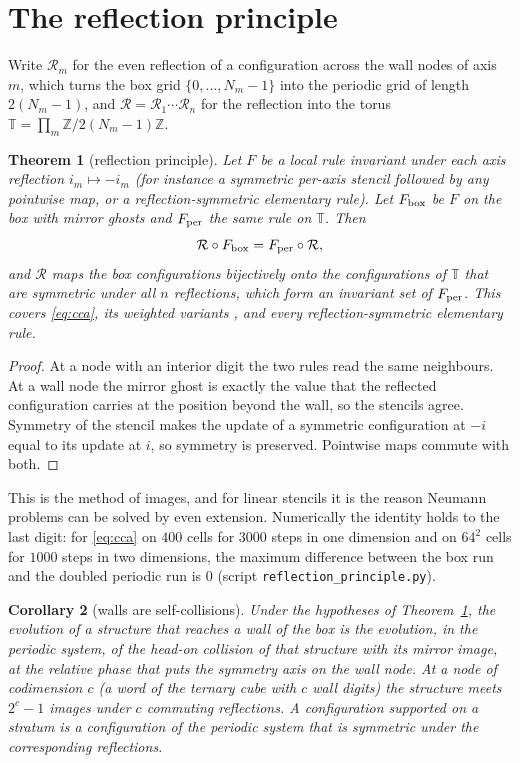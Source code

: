 \documentclass[11pt,a4paper]{article}
\newtheorem{theorem}{Theorem}[section]
\newtheorem{corollary}[theorem]{Corollary}
\theoremstyle{definition}
\theoremstyle{remark}
\newcommand{\Z}{\mathbb{Z}}
\begin{document}
\section{The reflection principle}\label{sec:reflection}

Write $\mathcal R_m$ for the even reflection of a configuration across
the wall nodes of axis $m$, which turns the box grid
$\{0,\dots,N_m-1\}$ into the periodic grid of length $2(N_m-1)$, and
$\mathcal R=\mathcal R_1\cdots\mathcal R_n$ for the reflection into the
torus $\mathbb T=\prod_m\Z/2(N_m-1)\Z$.

\begin{theorem}[reflection principle]\label{thm:reflection}
Let $F$ be a local rule invariant under each axis reflection
$i_m\mapsto-i_m$ (for instance a symmetric per-axis stencil followed by
any pointwise map, or a reflection-symmetric elementary rule). Let $F_{\rm box}$ be $F$ on
the box with mirror ghosts and $F_{\rm per}$ the same rule on
$\mathbb T$. Then
\[
  \mathcal R\circ F_{\rm box}=F_{\rm per}\circ\mathcal R ,
\]
and $\mathcal R$ maps the box configurations bijectively onto the
configurations of $\mathbb T$ that are symmetric under all $n$
reflections, which form an invariant set of $F_{\rm per}$. This covers
\eqref{eq:cca}, its weighted variants \cite[p.~244]{NKS}, and every
reflection-symmetric elementary rule.
\end{theorem}

\begin{proof}
At a node with an interior digit the two rules read the same neighbours.
At a wall node the mirror ghost is exactly the value that the reflected
configuration carries at the position beyond the wall, so the stencils
agree. Symmetry of the stencil makes the update of a symmetric
configuration at $-i$ equal to its update at $i$, so symmetry is
preserved. Pointwise maps commute with both.
\end{proof}

This is the method of images, and for linear stencils it is the reason
Neumann problems can be solved by even extension. Numerically the
identity holds to the last digit: for \eqref{eq:cca} on $400$ cells for
$3000$ steps in one dimension and on $64^2$ cells for $1000$ steps in
two dimensions, the maximum difference between the box run and the
doubled periodic run is $0$ (script \texttt{reflection\_principle.py}).

\begin{corollary}[walls are self-collisions]\label{cor:self}
Under the hypotheses of Theorem~\ref{thm:reflection}, the evolution of
a structure that reaches a wall of the box is the evolution, in the
periodic system, of the head-on collision of that structure with its
mirror image, at the relative phase that puts the symmetry axis on the
wall node. At a node of codimension $c$ (a word of the ternary cube with
$c$ wall digits) the structure meets $2^c-1$ images under $c$ commuting
reflections. A configuration supported on a stratum is a configuration
of the periodic system that is symmetric under the corresponding
reflections.
\end{corollary}
\end{document}
